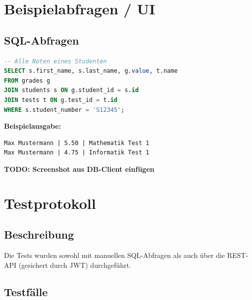 \documentclass[12pt,a4paper]{article}
\begin{document}
    \section{Beispielabfragen / UI}

    \subsection{SQL-Abfragen}
    \begin{lstlisting}[language=SQL]
-- Alle Noten eines Studenten
SELECT s.first_name, s.last_name, g.value, t.name
FROM grades g
JOIN students s ON g.student_id = s.id
JOIN tests t ON g.test_id = t.id
WHERE s.student_number = 'S12345';
    \end{lstlisting}

    \textbf{Beispielausgabe:}
    \begin{verbatim}
Max Mustermann | 5.50 | Mathematik Test 1
Max Mustermann | 4.75 | Informatik Test 1
    \end{verbatim}

    \textbf{TODO: Screenshot aus DB-Client einfügen}
    \newpage

    \section{Testprotokoll}

    \subsection{Beschreibung}
    Die Tests wurden sowohl mit manuellen SQL-Abfragen als auch über die REST-API (gesichert durch JWT) durchgeführt.

    \subsection{Testfälle}\label{sec:testfaelle}
\end{document}
